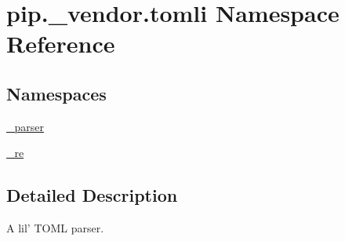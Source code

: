 \hypertarget{namespacepip_1_1__vendor_1_1tomli}{}\section{pip.\+\_\+vendor.\+tomli Namespace Reference}
\label{namespacepip_1_1__vendor_1_1tomli}
\subsection*{Namespaces}
\begin{DoxyCompactItemize}
\item 
 \hyperlink{namespacepip_1_1__vendor_1_1tomli_1_1__parser}{\+\_\+parser}
\item 
 \hyperlink{namespacepip_1_1__vendor_1_1tomli_1_1__re}{\+\_\+re}
\end{DoxyCompactItemize}


\subsection{Detailed Description}
\begin{DoxyVerb}A lil' TOML parser.\end{DoxyVerb}
 